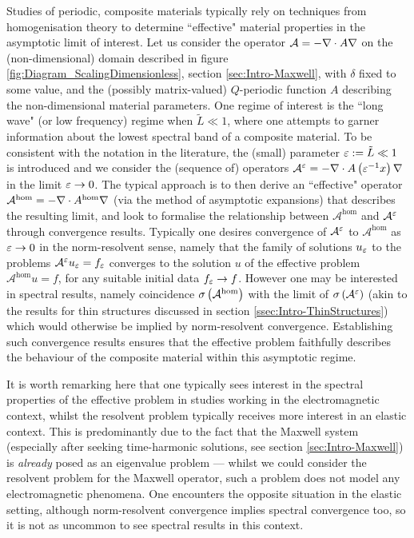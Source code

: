 Studies of periodic, composite materials typically rely on techniques from homogenisation theory to determine ``effective" material properties in the asymptotic limit of interest.
Let us consider the operator $\mathcal{A}=-\nabla\cdot A\nabla$ on the (non-dimensional) domain described in figure \ref{fig:Diagram_ScalingDimensionless}, section \ref{sec:Intro-Maxwell}, with $\delta$ fixed to some value, and the (possibly matrix-valued) $Q$-periodic function $A$ describing the non-dimensional material parameters.
One regime of interest is the ``long wave" (or low frequency) regime when $\tilde{L}\ll 1$, where one attempts to garner information about the lowest spectral band of a composite material.
To be consistent with the notation in the literature, the (small) parameter $\varepsilon:=\tilde{L}\ll 1$ is introduced and we consider the (sequence of) operators $\mathcal{A}^{\varepsilon} = -\nabla\cdot A\left( \varepsilon^{-1}x \right)\nabla$ in the limit $\varepsilon\rightarrow0$.
The typical approach is to then derive an ``effective" operator $\mathcal{A}^{\mathrm{hom}} = -\nabla\cdot A^{\mathrm{hom}}\nabla$ (via the method of asymptotic expansions) that describes the resulting limit, and look to formalise the relationship between $\mathcal{A}^{\mathrm{hom}}$ and $\mathcal{A}^{\varepsilon}$ through convergence results.
Typically one desires convergence of $\mathcal{A}^{\varepsilon}$ to $\mathcal{A}^{\mathrm{hom}}$ as $\varepsilon\rightarrow0$ in the norm-resolvent sense, namely that the family of solutions $u_{\varepsilon}$ to the problems $\mathcal{A}^{\varepsilon}u_{\varepsilon}=f_{\varepsilon}$ converges to the solution $u$ of the effective problem $\mathcal{A}^{\mathrm{hom}}u = f$, for any suitable initial data $f_{\varepsilon}\rightarrow f$.
However one may be interested in spectral results, namely coincidence $\sigma\left( \mathcal{A}^{\mathrm{hom}} \right)$ with the limit of $\sigma\left( \mathcal{A}^{\varepsilon} \right)$ (akin to the results for thin structures discussed in section \ref{ssec:Intro-ThinStructures}) which would otherwise be implied by norm-resolvent convergence.
Establishing such convergence results ensures that the effective problem faithfully describes the behaviour of the composite material within this asymptotic regime.

It is worth remarking here that one typically sees interest in the spectral properties of the effective problem in studies working in the electromagnetic context, whilst the resolvent problem typically receives more interest in an elastic context.
This is predominantly due to the fact that the Maxwell system (especially after seeking time-harmonic solutions, see section \ref{sec:Intro-Maxwell}) is \emph{already} posed as an eigenvalue problem --- whilst we could consider the resolvent problem for the Maxwell operator, such a problem does not model any electromagnetic phenomena.
One encounters the opposite situation in the elastic setting, although norm-resolvent convergence implies spectral convergence too, so it is not as uncommon to see spectral results in this context.

